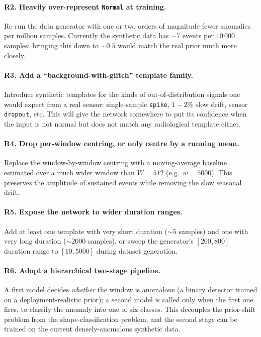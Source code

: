 \paragraph{R2. Heavily over-represent \texttt{Normal} at training.}
Re-run the data generator with one or two orders of magnitude fewer
anomalies per million samples. Currently the synthetic data has
$\sim 7$ events per $10\,000$ samples; bringing this down to $\sim 0.5$
would match the real prior much more closely.

\paragraph{R3. Add a ``background-with-glitch'' template family.}
Introduce synthetic templates for the kinds of out-of-distribution
signals one would expect from a real sensor: single-sample
\texttt{spike}, $1{-}2\%$ slow drift, sensor \texttt{dropout}, etc.
This will give the network somewhere to put its confidence when the
input is not normal but does not match any radiological template either.

\paragraph{R4. Drop per-window centring, or only centre by a running mean.}
Replace the window-by-window centring with a moving-average baseline
estimated over a much wider window than $W = 512$ (e.g.\ $w = 5000$).
This preserves the amplitude of sustained events while removing the
slow seasonal drift.

\paragraph{R5. Expose the network to wider duration ranges.}
Add at least one template with very short duration ($\sim 5$ samples) and
one with very long duration ($\sim 2000$ samples), or sweep the
generator's $[200, 800]$ duration range to $[10, 5000]$ during dataset
generation.

\paragraph{R6. Adopt a hierarchical two-stage pipeline.}
A first model decides \emph{whether} the window is anomalous (a binary
detector trained on a deployment-realistic prior); a second model is
called only when the first one fires, to classify the anomaly into one
of six classes. This decouples the prior-shift problem from the
shape-classification problem, and the second stage can be trained on
the current densely-anomalous synthetic data.

